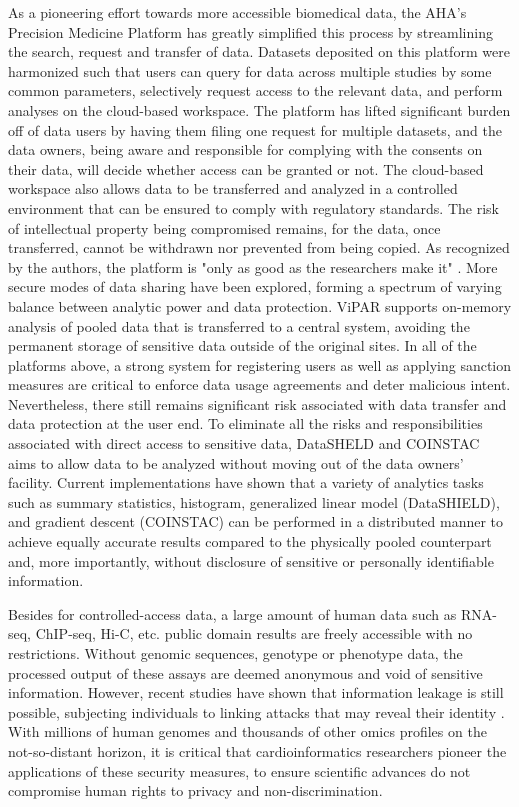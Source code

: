 \documentclass[letter]{bioinfo}
\begin{document}
	As a pioneering effort towards more accessible biomedical data, the AHA's Precision Medicine Platform \citep{Kass-Hout:2018:American} has greatly simplified this process by streamlining the search, request and transfer of data. Datasets deposited on this platform were harmonized such that users can query for data across multiple studies by some common parameters, selectively request access to the relevant data, and perform analyses on the cloud-based workspace. The platform has lifted significant burden off of data users by having them filing one request for multiple datasets, and the data owners, being aware and responsible for complying with the consents on their data, will decide whether access can be granted or not. The cloud-based workspace also allows data to be transferred and analyzed in a controlled environment that can be ensured to comply with regulatory standards. The risk of intellectual property being compromised remains, for the data, once transferred, cannot be withdrawn nor prevented from being copied. As recognized by the authors, the platform is "only as good as the researchers make it" \citep{Kass-Hout:2018:American}.
	More secure modes of data sharing have been explored, forming a spectrum of varying balance between analytic power and data protection. ViPAR \citep{Carter:2016:ViPAR} supports on-memory analysis of pooled data that is transferred to a central system, avoiding the permanent storage of sensitive data outside of the original sites.  In all of the platforms above, a strong system for registering users as well as applying sanction measures are critical to enforce data usage agreements and deter malicious intent. Nevertheless, there still remains significant risk associated with data transfer and data protection at the user end.
	To eliminate all the risks and responsibilities associated with direct access to sensitive data, DataSHELD \citep{Gaye:2014:DataSHIELD, Wilson:2017:DataSHIELD} and COINSTAC \citep{Plis:2016:COINSTAC} aims to allow data to be analyzed without moving out of the data owners' facility. Current implementations have shown that a variety of analytics tasks such as summary statistics, histogram, generalized linear model (DataSHIELD), and gradient descent (COINSTAC) can be performed in a distributed manner to achieve equally accurate results compared to the physically pooled counterpart and, more importantly, without disclosure of sensitive or personally identifiable information.
	
	Besides for controlled-access data, a large amount of human data such as RNA-seq, ChIP-seq, Hi-C, etc. public domain results are freely accessible with no restrictions. Without genomic sequences, genotype or phenotype data, the processed output of these assays are deemed anonymous and void of sensitive information. However, recent studies have shown that information leakage is still possible, subjecting individuals to linking attacks that may reveal their identity \citep{Harmanci:2016:Quantification, Harmanci:2018:Analysis}.  With millions of human genomes and thousands of other omics profiles on the not-so-distant horizon, it is critical that cardioinformatics researchers pioneer the applications of these security measures, to ensure scientific advances do not compromise human rights to privacy and non-discrimination.
	
\end{document}
